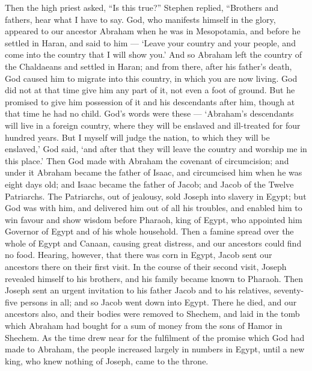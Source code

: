  Then the high priest asked, ``Is this true?'' 
Stephen replied, ``Brothers and fathers, hear what I have to say. God,
who manifests himself in the glory, appeared to our ancestor Abraham
when he was in Mesopotamia, and before he settled in Haran, and said to
him ---  `Leave your country and your people, and come into
the country that I will show you.'  And so Abraham left the
country of the Chaldaeans and settled in Haran; and from there, after
his father's death, God caused him to migrate into this country, in
which you are now living.  God did not at that time give him
any part of it, not even a foot of ground. But he promised to give him
possession of it and his descendants after him, though at that time he
had no child.  God's words were these --- `Abraham's
descendants will live in a foreign country, where they will be enslaved
and ill-treated for four hundred years.  But I myself will
judge the nation, to which they will be enslaved,' God said, `and after
that they will leave the country and worship me in this place.'
 Then God made with Abraham the covenant of circumcision;
and under it Abraham became the father of Isaac, and circumcised him
when he was eight days old; and Isaac became the father of Jacob; and
Jacob of the Twelve Patriarchs.  The Patriarchs, out of
jealousy, sold Joseph into slavery in Egypt; but God was with him,
 and delivered him out of all his troubles, and enabled him
to win favour and show wisdom before Pharaoh, king of Egypt, who
appointed him Governor of Egypt and of his whole household.
 Then a famine spread over the whole of Egypt and Canaan,
causing great distress, and our ancestors could find no food.
 Hearing, however, that there was corn in Egypt, Jacob sent
our ancestors there on their first visit.  In the course of
their second visit, Joseph revealed himself to his brothers, and his
family became known to Pharaoh.  Then Joseph sent an urgent
invitation to his father Jacob and to his relatives, seventy-five
persons in all;  and so Jacob went down into Egypt. There
he died, and our ancestors also,  and their bodies were
removed to Shechem, and laid in the tomb which Abraham had bought for a
sum of money from the sons of Hamor in Shechem.  As the
time drew near for the fulfilment of the promise which God had made to
Abraham, the people increased largely in numbers in Egypt, 
until a new king, who knew nothing of Joseph, came to the throne.
